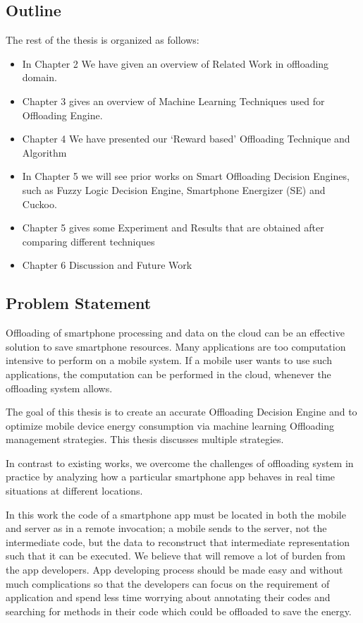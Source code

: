 \documentclass[12pt]{report}
\begin{document}
\subsection{Outline}
The rest of the thesis is organized as follows:
\begin{itemize}
	
	\item In Chapter 2 We have given an overview of Related Work in offloading domain.
	\item Chapter 3 gives an overview of Machine Learning Techniques used for Offloading Engine.
	\item Chapter 4 We have presented our `Reward based' Offloading Technique and Algorithm
	\item In Chapter 5 we will see prior works on Smart Offloading Decision Engines, such as Fuzzy Logic Decision Engine, Smartphone Energizer (SE) and Cuckoo.
	\item Chapter 5 gives some Experiment and Results that are obtained after comparing different techniques
	\item Chapter 6 Discussion and Future Work

\end{itemize}
\subsection{Problem Statement} %

Offloading of smartphone processing and data on the cloud can be an effective solution to save smartphone resources. Many applications are too computation intensive to perform on a mobile system. If a mobile user wants to use
such applications, the computation can be performed in the cloud, whenever the offloading system allows.

The goal of this thesis is to create an accurate Offloading Decision Engine and to optimize
mobile device energy consumption via machine learning Offloading management strategies.
This thesis discusses multiple strategies. 

In contrast to existing works, we overcome the challenges of offloading system in practice by 
analyzing how a particular smartphone app behaves in real time situations at different locations.

In this work the code of a smartphone app must be located in both the mobile and server as in a
remote invocation; a mobile sends to the server, not the intermediate code, but the data to reconstruct that intermediate representation such that it can be executed. We believe that will remove a lot of burden from the app developers. App developing process should be made easy and without much complications so that the developers can focus on the requirement of application and spend less time worrying about annotating their codes and searching for methods in their code which could be offloaded to save the energy.
\end{document}
